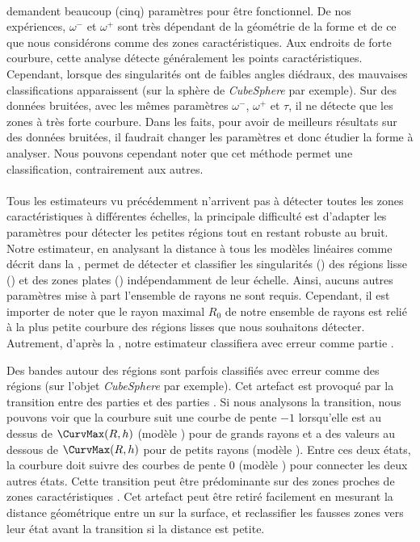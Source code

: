 \paragraph{}
 demandent beaucoup (cinq) paramètres pour être fonctionnel. De nos expériences, $\omega^-$ et $\omega^+$ sont très dépendant de la géométrie de la forme et de ce que nous considérons comme des zones caractéristiques. Aux endroits de forte courbure, cette analyse détecte généralement les points caractéristiques. Cependant, lorsque des singularités ont de faibles angles diédraux, des mauvaises classifications apparaissent (sur la sphère de \emph{CubeSphere} par exemple). Sur des données bruitées, avec les mêmes paramètres $\omega^-$, $\omega^+$ et $\tau$, il ne détecte que les zones à très forte courbure. Dans les faits, pour avoir de meilleurs résultats sur des données bruitées, il faudrait changer les paramètres et donc étudier la forme à analyser. Nous pouvons cependant noter que cet méthode permet une classification, contrairement aux autres.

\paragraph{}
Tous les estimateurs vu précédemment n'arrivent pas à détecter toutes les zones caractéristiques à différentes échelles, la principale difficulté est d'adapter les paramètres pour détecter les petites régions tout en restant robuste au bruit. Notre estimateur, en analysant la distance à tous les modèles linéaires comme décrit dans la , permet de détecter et classifier les singularités (\featedge) des régions lisse (\featsmooth) et des zones plates (\featflat) indépendamment de leur échelle. Ainsi, aucuns autres paramètres mise à part l'ensemble de rayons ne sont requis. Cependant, il est importer de noter que le rayon maximal $R_0$ de notre ensemble de rayons est relié à la plus petite courbure des régions lisses que nous souhaitons détecter. Autrement, d'après la , notre estimateur classifiera avec erreur comme partie \featflat.

Des bandes autour des régions \featedge sont parfois classifiés avec erreur comme des régions \featsmooth (sur l'objet \emph{CubeSphere} par exemple). Cet artefact est provoqué par la transition entre des parties \featflat et des parties \featedge. Si nous analysons la transition, nous pouvons voir que la courbure suit une courbe de pente $-1$ lorsqu'elle est au dessus de $\CurvMax(R,h)$ (modèle \featedge) pour de grands rayons et a des valeurs au dessous de $\CurvMax(R,h)$ pour de petits rayons (modèle \featflat). Entre ces deux états, la courbure doit suivre des courbes de pente $0$ (modèle \featsmooth) pour connecter les deux autres états. Cette transition peut être prédominante sur des zones proches de zones caractéristiques \featedge. Cet artefact peut être retiré facilement en mesurant la distance géométrique entre un \featedge sur la surface, et reclassifier les fausses zones \featsmooth vers leur état avant la transition si la distance est petite.

